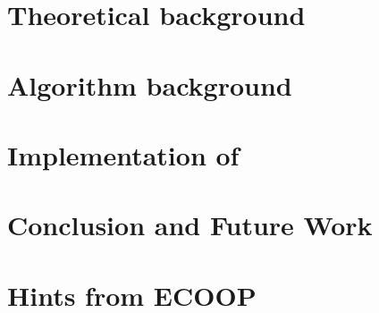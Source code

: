 \documentclass[nonatbib,preprint,numbers]{sigplanconf}
\begin{document}
\section{Theoretical background}
\label{section:theoretical-background}


\section{Algorithm background}
\label{section:algorithm}


\section{Implementation of \Fajita}
\label{section:implementation}


\section{Conclusion and Future Work}
\label{section:zz}


\small


\clearpage
\appendix
\section{Hints from ECOOP}
\label{section:ecoop}

\end{document}
